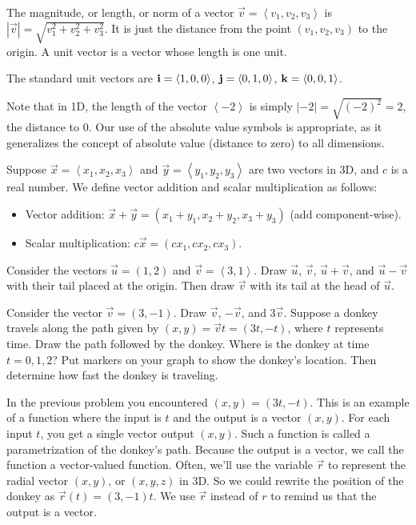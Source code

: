 \begin{definition}
The magnitude, or length, or norm of a vector $\vec v = \left<v_1,v_2,v_3\right>$ is $|\vec v| = \sqrt{v_1^2+v_2^2+v_3^2}$. It is just the distance from the point $(v_1,v_2,v_3)$ to the origin. A unit vector is a vector whose length is one unit. 

The standard unit vectors are ${\bf i}=\left<1,0,0\right>$, ${\bf j}=\left<0,1,0\right>$, ${\bf k}=\left<0,0,1\right>$. 
\end{definition}
Note that in 1D, the length of the vector $\left<-2\right>$ is simply $|-2|=\sqrt{(-2)^2}=2$, the distance to 0. Our use of the absolute value symbols is appropriate, as it generalizes the concept of absolute value (distance to zero) to all dimensions.

\begin{definition}
Suppose $\vec x=\left<x_1,x_2,x_3\right>$ and $\vec y=\left<y_1,y_2,y_3\right>$ are two vectors in 3D, and $c$ is a real number. We define vector addition and scalar multiplication as follows:
\begin{itemize}
\item Vector addition: $\vec x+\vec y = (x_1+y_1,x_2+y_2,x_3+y_3)$ (add component-wise).
\item Scalar multiplication: $c\vec x = (cx_1,cx_2,cx_3)$.
\end{itemize}
\end{definition}


\begin{problem}
Consider the vectors $\vec u=(1,2)$ and $\vec v=\left<3,1\right>$.  Draw $\vec u$, $\vec v$, $\vec u+\vec v$, and $\vec u-\vec v$ with their tail placed at the origin.  Then draw $\vec v$ with its tail at the head of $\vec u$. 
\end{problem}

\begin{problem}
Consider the vector $\vec v=(3,-1)$.  Draw $\vec v$, $-\vec v$, and $3\vec v$. 
Suppose a donkey travels along the path given by $(x,y)=\vec v t = (3t,-t)$, where $t$ represents time. Draw the path followed by the donkey. Where is the donkey at time $t=0,1,2$? Put markers on your graph to show the donkey's location. Then determine how fast the donkey is traveling.
\end{problem}

In the previous problem you encountered $(x,y)=(3t,-t)$.  This is an example of a function where the input is $t$ and the output is a vector $(x,y)$.  For each input $t$, you get a single vector output $(x,y)$. Such a function is called a parametrization of the donkey's path. Because the output is a vector, we call the function a vector-valued function. Often, we'll use the variable $\vec r$ to represent the radial vector $(x,y)$, or $(x,y,z)$ in 3D.  So we could rewrite the position of the donkey as $\vec r(t)=(3,-1)t$. We use $\vec r$ instead of $r$ to remind us that the output is a vector.

